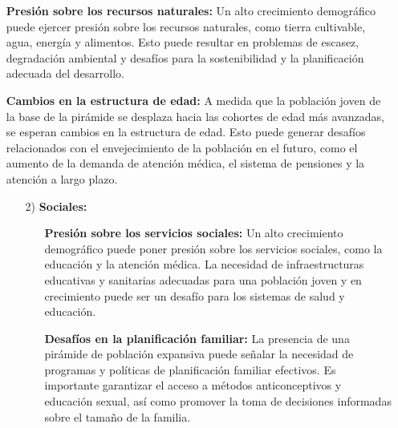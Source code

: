 \documentclass[8pt,a4paper]{beamer}
\begin{document}
{\begin{frame}{}
\begin{block}{}
\begin{enumerate}
\begin{enumerate}
\begin{itemize}
\item[\ding{65}] \textbf{Presión sobre los recursos naturales:} Un alto crecimiento demográfico puede ejercer presión sobre los recursos naturales, como tierra cultivable, agua, energía y alimentos. Esto puede resultar en problemas de escasez, degradación ambiental y desafíos para la sostenibilidad y la planificación adecuada del desarrollo.

\item[\ding{65}] \textbf{Cambios en la estructura de edad:} A medida que la población joven de la base de la pirámide se desplaza hacia las cohortes de edad más avanzadas, se esperan cambios en la estructura de edad. Esto puede generar desafíos relacionados con el envejecimiento de la población en el futuro, como el aumento de la demanda de atención médica, el sistema de pensiones y la atención a largo plazo.
\end{itemize}
\end{enumerate}
\end{enumerate}
\end{block}
\end{frame}


\begin{frame}{}
\begin{block}{}
\justifying
\begin{enumerate}
\justifying
\item[{}] 
\begin{enumerate}
\justifying
\item[2)] \textbf{Sociales:} 
\begin{itemize}
\justifying
\item[\ding{65}] \textbf{Presión sobre los servicios sociales:} Un alto crecimiento demográfico puede poner presión sobre los servicios sociales, como la educación y la atención médica. La necesidad de infraestructuras educativas y sanitarias adecuadas para una población joven y en crecimiento puede ser un desafío para los sistemas de salud y educación.

\item[\ding{65}] \textbf{Desafíos en la planificación familiar:} La presencia de una pirámide de población expansiva puede señalar la necesidad de programas y políticas de planificación familiar efectivos. Es importante garantizar el acceso a métodos anticonceptivos y educación sexual, así como promover la toma de decisiones informadas sobre el tamaño de la familia.


\end{itemize}
\end{enumerate}
\end{enumerate}
\end{block}
\end{frame}}
\end{document}
